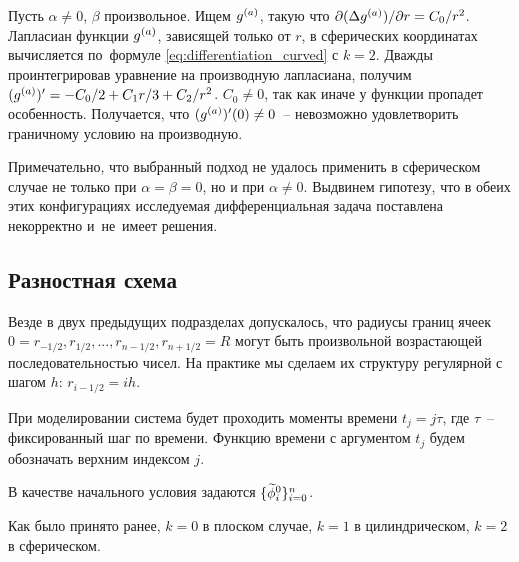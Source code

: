 Пусть $\alpha \neq 0$, $\beta$ произвольное. Ищем ${g^{(a)}}$, такую что $\partial (\Delta {g^{(a)}}) / \partial r = C_0 / r^2$. Лапласиан функции ${g^{(a)}}$, зависящей только от $r$, в сферических координатах вычисляется по~формуле \eqref{eq:differentiation_curved} с $k = 2$. Дважды проинтегрировав уравнение на производную лапласиана, получим $({g^{(a)}})' = -C_0 / 2 + C_1 r / 3 + C_2 / r^2$. $C_0 \neq 0$, так как иначе у функции пропадет особенность. Получается, что $(\ga)'(0) \hm \neq 0$~-- невозможно удовлетворить граничному условию на производную.

Примечательно, что выбранный подход не удалось применить в сферическом случае не только при $\alpha = \beta = 0$, но и при $\alpha \neq 0$. Выдвинем гипотезу, что в обеих этих конфигурациях исследуемая дифференциальная задача поставлена некорректно и~не~имеет решения.


\subsection{Разностная схема}

Везде в двух предыдущих подразделах допускалось, что радиусы границ ячеек $0 = r_{-1/2}, r_{1/2}, ..., r_{n - 1/2}, r_{n + 1/2} = R$ могут быть произвольной возрастающей последовательностью чисел. На практике мы сделаем их структуру регулярной с шагом $h$: $r_{i - 1/2} = ih$.

При моделировании система будет проходить моменты времени $t_j = j \tau$, где $\tau$~-- фиксированный шаг по времени. Функцию времени с аргументом $t_j$ будем обозначать верхним индексом $j$.

В качестве начального условия задаются $\{ {\widetilde{\phi}}_i^0 \}_{i = 0}^n$.

Как было принято ранее, $k = 0$ в плоском случае, $k = 1$ в цилиндрическом, $k = 2$ в сферическом.

